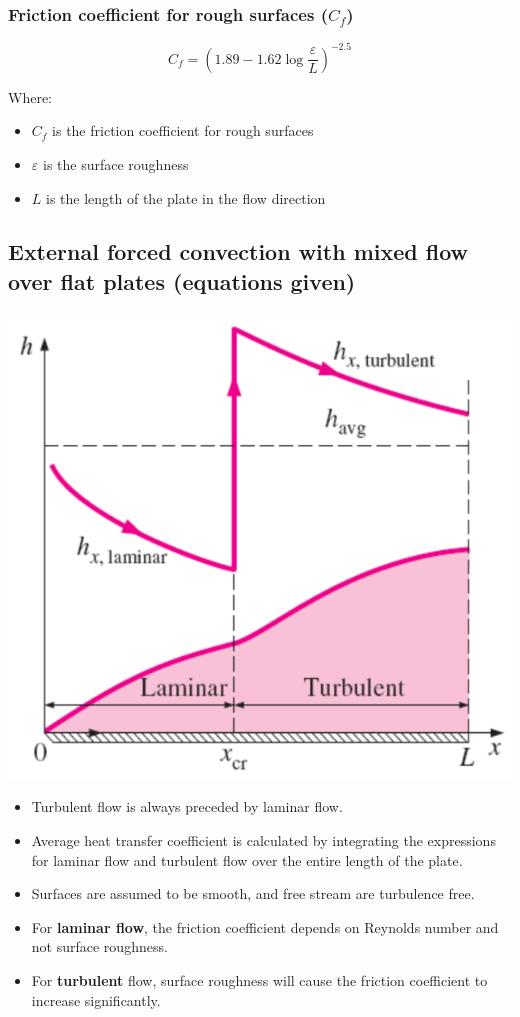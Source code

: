 \documentclass[11pt]{article}
\begin{document}
\subsubsection{Friction coefficient for rough surfaces (\(C_f\))}
\label{sec:orge5bc7c8}
\[C_f = \left(1.89 - 1.62 \log \frac{\varepsilon}{L} \right)^{-2.5}\]

Where:
\begin{itemize}
\item \(C_f\) is the friction coefficient for rough surfaces
\item \(\varepsilon\) is the surface roughness
\item \(L\) is the length of the plate in the flow direction
\end{itemize}
\subsection{External forced convection with mixed flow over flat plates (equations given)}
\label{sec:orgae77516}
\begin{center}
\includegraphics[width=.9\linewidth]{./images/external-forced-convection-with-mixed-flow-over-flat-plate.png}
\end{center}
\begin{itemize}
\item Turbulent flow is always preceded by laminar flow.
\item Average heat transfer coefficient is calculated by integrating the expressions for laminar flow and turbulent flow over the entire length of the plate.
\item Surfaces are assumed to be smooth, and free stream are turbulence free.
\item For \textbf{laminar flow}, the friction coefficient depends on Reynolds number and not surface roughness.
\item For \textbf{turbulent} flow, surface roughness will cause the friction coefficient to increase significantly.
\end{itemize}
\end{document}
